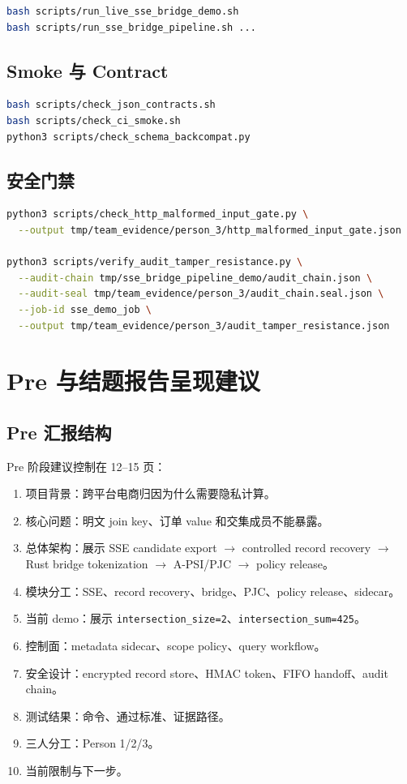 \documentclass[UTF8,a4paper,12pt,oneside]{ctexrep}
\newcommand{\pipeline}{SSE candidate export $\rightarrow$ controlled record recovery $\rightarrow$ Rust bridge tokenization $\rightarrow$ A-PSI/PJC $\rightarrow$ policy release}
\begin{document}
\begin{lstlisting}[language=bash]
bash scripts/run_live_sse_bridge_demo.sh
bash scripts/run_sse_bridge_pipeline.sh ...
\end{lstlisting}

\section{Smoke 与 Contract}

\begin{lstlisting}[language=bash]
bash scripts/check_json_contracts.sh
bash scripts/check_ci_smoke.sh
python3 scripts/check_schema_backcompat.py
\end{lstlisting}

\section{安全门禁}

\begin{lstlisting}[language=bash]
python3 scripts/check_http_malformed_input_gate.py \
  --output tmp/team_evidence/person_3/http_malformed_input_gate.json

python3 scripts/verify_audit_tamper_resistance.py \
  --audit-chain tmp/sse_bridge_pipeline_demo/audit_chain.json \
  --audit-seal tmp/team_evidence/person_3/audit_chain.seal.json \
  --job-id sse_demo_job \
  --output tmp/team_evidence/person_3/audit_tamper_resistance.json
\end{lstlisting}

\chapter{Pre 与结题报告呈现建议}

\section{Pre 汇报结构}

Pre 阶段建议控制在 12--15 页：

\begin{enumerate}
  \item 项目背景：跨平台电商归因为什么需要隐私计算。
  \item 核心问题：明文 join key、订单 value 和交集成员不能暴露。
  \item 总体架构：展示 \pipeline。
  \item 模块分工：SSE、record recovery、bridge、PJC、policy release、sidecar。
  \item 当前 demo：展示 \texttt{intersection\_size=2}、\texttt{intersection\_sum=425}。
  \item 控制面：metadata sidecar、scope policy、query workflow。
  \item 安全设计：encrypted record store、HMAC token、FIFO handoff、audit chain。
  \item 测试结果：命令、通过标准、证据路径。
  \item 三人分工：Person 1/2/3。
  \item 当前限制与下一步。
\end{enumerate}
\end{document}
